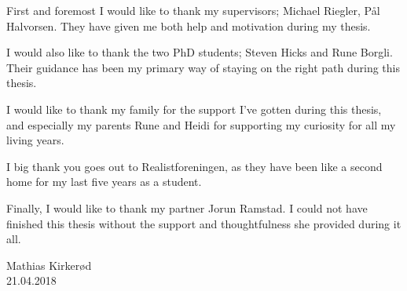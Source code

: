 First and foremost I would like to thank my supervisors; Michael Riegler, Pål Halvorsen. They have given me both help and motivation during my thesis.

I would also like to thank the two PhD students; Steven Hicks and Rune Borgli. Their guidance has been my primary way of staying on the right path during this thesis. 

I would like to thank my family for the support I've gotten during this thesis, and especially my parents Rune and Heidi for supporting my curiosity for all my living years. 

I big thank you goes out to Realistforeningen, as they have been like a second home for my last five years as a student.

Finally, I would like to thank my partner Jorun Ramstad. I could not have finished this thesis without the support and thoughtfulness she provided during it all.

\vspace{10px}
\noindent
Mathias Kirker{\o}d\\
21.04.2018




